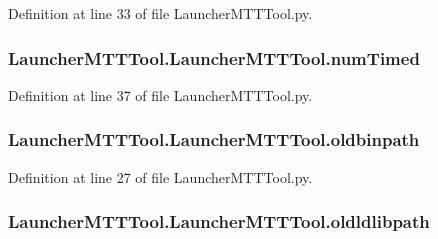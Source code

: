 Definition at line 33 of file Launcher\-M\-T\-T\-Tool.\-py.

\hypertarget{class_launcher_m_t_t_tool_1_1_launcher_m_t_t_tool_ae2be62c3d068b4c1c3d7c1ddaf4cfdbe}{
\subsubsection[{num\-Timed}]{\setlength{\rightskip}{0pt plus 5cm}Launcher\-M\-T\-T\-Tool.\-Launcher\-M\-T\-T\-Tool.\-num\-Timed}}\label{class_launcher_m_t_t_tool_1_1_launcher_m_t_t_tool_ae2be62c3d068b4c1c3d7c1ddaf4cfdbe}


Definition at line 37 of file Launcher\-M\-T\-T\-Tool.\-py.

\hypertarget{class_launcher_m_t_t_tool_1_1_launcher_m_t_t_tool_acf34764e2b173537cbf5720cc0a1235d}{
\subsubsection[{oldbinpath}]{\setlength{\rightskip}{0pt plus 5cm}Launcher\-M\-T\-T\-Tool.\-Launcher\-M\-T\-T\-Tool.\-oldbinpath}}\label{class_launcher_m_t_t_tool_1_1_launcher_m_t_t_tool_acf34764e2b173537cbf5720cc0a1235d}


Definition at line 27 of file Launcher\-M\-T\-T\-Tool.\-py.

\hypertarget{class_launcher_m_t_t_tool_1_1_launcher_m_t_t_tool_abb2e78c53544b045ef3ab42ed8b68806}{
\subsubsection[{oldldlibpath}]{\setlength{\rightskip}{0pt plus 5cm}Launcher\-M\-T\-T\-Tool.\-Launcher\-M\-T\-T\-Tool.\-oldldlibpath}}\label{class_launcher_m_t_t_tool_1_1_launcher_m_t_t_tool_abb2e78c53544b045ef3ab42ed8b68806}


